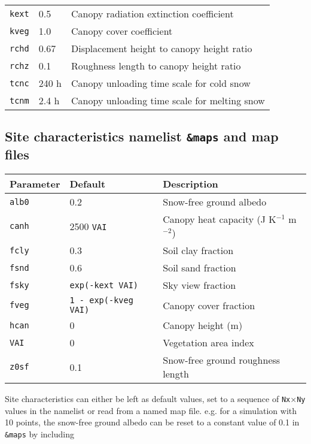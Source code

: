 \documentclass{article}
\begin{document}
\begin{tabular}{|l|l|l|}
{\tt kext} & 0.5             & Canopy radiation extinction coefficient      \\
{\tt kveg} & 1.0             & Canopy cover coefficient                     \\
{\tt rchd} & 0.67            & Displacement height to canopy height ratio   \\
{\tt rchz} & 0.1             & Roughness length to canopy height ratio      \\
{\tt tcnc} & 240 h           & Canopy unloading time scale for cold snow    \\
{\tt tcnm} & 2.4 h           & Canopy unloading time scale for melting snow \\
\hline 
\end{tabular}

\subsection*{Site characteristics namelist {\tt \&maps} and map files}

\begin{tabular}{|l|l|l|}
\hline
Parameter   & Default              & Description                                \\
\hline
{\tt alb0}  & 0.2                  & Snow-free ground albedo                    \\
{\tt canh}  & 2500 {\tt VAI}       & Canopy heat capacity (J K$^{-1}$ m$^{-2}$) \\
{\tt fcly}  & 0.3                  & Soil clay fraction                         \\
{\tt fsnd}  & 0.6                  & Soil sand fraction                         \\
{\tt fsky}  & {\tt exp(-kext VAI)} & Sky view fraction                          \\
{\tt fveg}  & {\tt 1 - exp(-kveg VAI)}  & Canopy cover fraction                 \\
{\tt hcan}  & 0                    & Canopy height (m)                          \\
{\tt VAI}   & 0                    & Vegetation area index                      \\
{\tt z0sf}  & 0.1                  & Snow-free ground roughness length          \\
\hline 
\end{tabular}

Site characteristics can either be left as default values, set to a sequence of {\tt Nx$\times$Ny} values in the namelist or read from a named map file. e.g. for a simulation with 10 points, the snow-free ground albedo can be reset to a constant value of 0.1 in {\tt \&maps} by including
\end{document}
